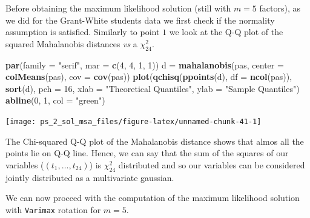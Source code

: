 \documentclass[
]{article}
\newenvironment{Shaded}{\begin{snugshade}}{\end{snugshade}}
\newcommand{\AttributeTok}[1]{\textcolor[rgb]{0.13,0.29,0.53}{#1}}
\newcommand{\DecValTok}[1]{\textcolor[rgb]{0.00,0.00,0.81}{#1}}
\newcommand{\FunctionTok}[1]{\textcolor[rgb]{0.13,0.29,0.53}{\textbf{#1}}}
\newcommand{\NormalTok}[1]{#1}
\newcommand{\OtherTok}[1]{\textcolor[rgb]{0.56,0.35,0.01}{#1}}
\newcommand{\SpecialCharTok}[1]{\textcolor[rgb]{0.81,0.36,0.00}{\textbf{#1}}}
\newcommand{\StringTok}[1]{\textcolor[rgb]{0.31,0.60,0.02}{#1}}
\theoremstyle{plain}
\begin{document}
Before obtaining the maximum likelihood solution (still with \(m = 5\)
factors), as we did for the Grant-White students data we first check if
the normality assumption is satisfied. \newline Similarly to point \(1\)
we look at the Q-Q plot of the squared Mahalanobis distances \textit{vs}
a \(\chi^2_{24}\).

\smallskip

\begin{Shaded}
\begin{Highlighting}[]
\FunctionTok{par}\NormalTok{(}\AttributeTok{family =} \StringTok{"serif"}\NormalTok{, }\AttributeTok{mar =} \FunctionTok{c}\NormalTok{(}\DecValTok{4}\NormalTok{, }\DecValTok{4}\NormalTok{, }\DecValTok{1}\NormalTok{, }\DecValTok{1}\NormalTok{))}
\NormalTok{d }\OtherTok{=} \FunctionTok{mahalanobis}\NormalTok{(pas, }\AttributeTok{center =} \FunctionTok{colMeans}\NormalTok{(pas), }\AttributeTok{cov =} \FunctionTok{cov}\NormalTok{(pas))}
\FunctionTok{plot}\NormalTok{(}\FunctionTok{qchisq}\NormalTok{(}\FunctionTok{ppoints}\NormalTok{(d), }\AttributeTok{df =} \FunctionTok{ncol}\NormalTok{(pas)), }\FunctionTok{sort}\NormalTok{(d), }\AttributeTok{pch =} \DecValTok{16}\NormalTok{,}
    \AttributeTok{xlab =} \StringTok{"Theoretical Quantiles"}\NormalTok{, }\AttributeTok{ylab =} \StringTok{"Sample Quantiles"}\NormalTok{)}
\FunctionTok{abline}\NormalTok{(}\DecValTok{0}\NormalTok{, }\DecValTok{1}\NormalTok{, }\AttributeTok{col =} \StringTok{"green"}\NormalTok{)}
\end{Highlighting}
\end{Shaded}

\begin{center}\texttt{[image: ps\_2\_sol\_msa\_files/figure-latex/unnamed-chunk-41-1]} \end{center}

The Chi-squared Q-Q plot of the Mahalanobis distance shows that almos
all the points lie on Q-Q line. Hence, we can say that the sum of the
squares of our variables (\((t_1, \dots, t_{24})\)) is \(\chi_{24}^2\)
distributed and so our variables can be considered jointly distributed
as a multivariate gaussian.

We can now proceed with the computation of the maximum likelihood
solution with \texttt{Varimax} rotation for \(m = 5\).

\begin{Shaded}
\end{Shaded}
\end{document}
